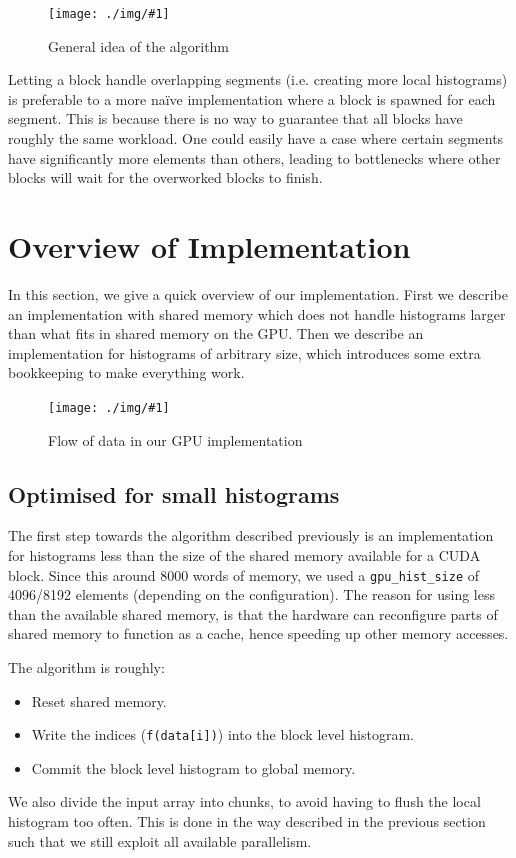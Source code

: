 \documentclass[12pt, a4paper, hidelinks]{article}
\newcommand{\fig}[3]{
\begin{figure}[h]
  \begin{center}
    \texttt{[image: ./img/\#1]}
  \end{center}
  \caption{#3}
  \label{fig:#1}
\end{figure}
}
\renewcommand{\tt}[1]{\texttt{#1}}
\begin{document}
\fig{overview}{140}{General idea of the algorithm}

Letting a block handle overlapping segments (i.e. creating more local histograms)
is preferable to a more naïve implementation where a block is spawned
for each segment. This is because there is no way to guarantee that all blocks have
roughly the same workload.
One could easily have a case where certain segments have significantly
more elements than others, leading to bottlenecks where other blocks will
wait for the overworked blocks to finish.

\section{Overview of Implementation}
In this section, we give a quick overview of our implementation.
First we describe an implementation with shared memory which does not handle
histograms larger than what fits in shared memory on the GPU.
Then we describe an implementation for histograms of arbitrary size,
which introduces some extra bookkeeping to make everything work.

\fig{device-dia}{140}{Flow of data in our GPU implementation}

\subsection{Optimised for small histograms}
The first step towards the algorithm described previously is an implementation
for histograms less than the size of the shared memory available for a CUDA block.
Since this around 8000 words of memory,
we used a \tt{gpu\_hist\_size} of 4096/8192 elements (depending on the configuration).
The reason for using less than the available shared memory, is that the hardware can
reconfigure parts of shared memory to function as a cache, hence speeding
up other memory accesses.

The algorithm is roughly:

\begin{itemize}
\item Reset shared memory.
\item Write the indices (\tt{f(data[i])}) into the block level histogram.
\item Commit the block level histogram to global memory.
\end{itemize}

We also divide the input array into chunks, to avoid having to flush the
local histogram too often. This is done in the way described in the previous section
such that we still exploit all available parallelism.
\end{document}
